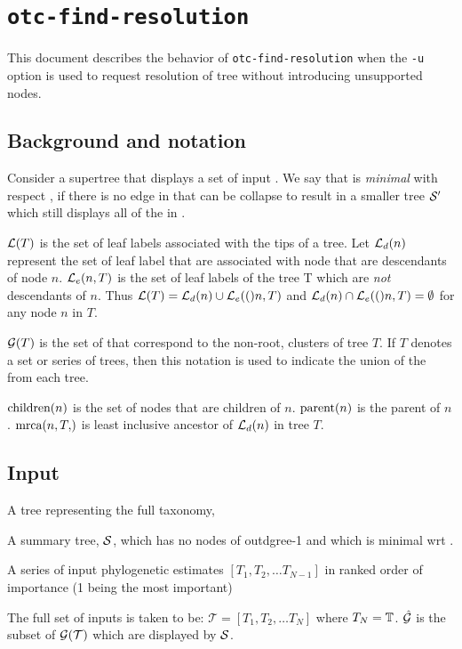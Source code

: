 \documentclass[11pt]{article}
\begin{document}
\section*{\texttt{otc-find-resolution}}
This document describes the behavior of \texttt{otc-find-resolution} when the \texttt{-u}
    option is used to request resolution of tree without introducing unsupported nodes.

\subsection*{Background and notation}
Consider a supertree \summaryTree that displays a set of input \pss \pssInOptimalTree.
We say that \summaryTree is {\em minimal} with respect \pssInOptimalTree, if there is
    no edge in \summaryTree that can be collapse to result in a smaller tree $\mathcal{S}^{\prime}$
    which still displays all of the \pss in \pssInOptimalTree.

$\mathcal{L}(T)$ is the set of leaf labels associated with the tips of a tree.
Let $\mathcal{L}_d(n)$ represent the set of leaf label that are associated with node that are descendants
    of node $n$.
$\mathcal{L}_e(n, T)$ is the set of leaf labels of the tree T which are {\em not} descendants of $n$.
Thus $\mathcal{L}(T) = \mathcal{L}_d(n) \cup \mathcal{L}_e(()n, T)$ and $\mathcal{L}_d(n) \cap \mathcal{L}_e(()n, T)=\emptyset$ for any node $n$ in $T$.

$\mathcal{G}(T)$ is the set of \pss that correspond to the non-root, clusters of tree $T$.
If $T$ denotes a set or series of trees, then this notation is used to indicate the union of the \pss from each tree.

$\mbox{children}(n)$ is the set of nodes that are children of $n$.
$\mbox{parent}(n)$ is the parent of $n$.
$\mrca{n, T}$ is least inclusive ancestor of $\mathcal{L}_d(n)$ in tree $T$.

\subsection*{Input}
\begin{compactitem}
    \item A tree representing the full taxonomy, \taxonomy
    \item A summary tree, $\mathcal{S}$, which has no nodes of outdgree-1 and which is minimal wrt \pssInOptimalTree.
    \item A series of input phylogenetic estimates  $[T_1, T_2, \ldots T_{N-1}]$ in ranked order of importance (1 being the most important)
\end{compactitem}
The full set of inputs is taken to be: $\mathcal{T} = [T_1, T_2, \ldots T_{N}]$ where $T_N = \mathbb{T}$.
    $\hat{\mathcal{G}}$ is the subset of $\mathcal{G}(\mathcal{T})$ which are displayed by $\mathcal{S}$.
\end{document}
